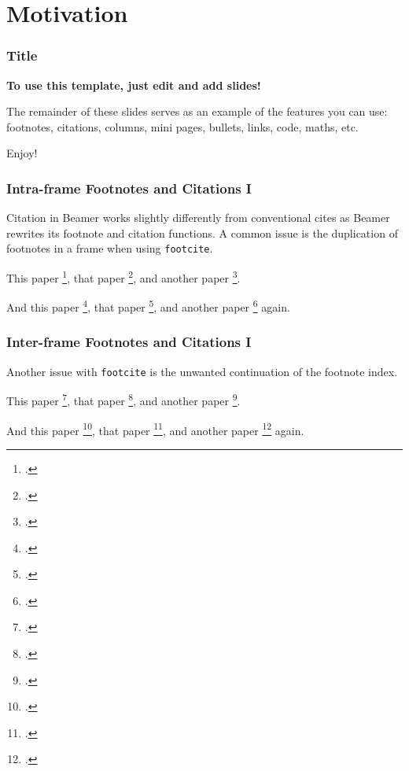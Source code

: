 \section{Motivation} %

\begin{frame}
    \frametitle{Title}
    \begin{center}
        \textbf{To use this template, just edit and add slides!} \newline
    \end{center}

    The remainder of these slides serves as an example of the features you can use: footnotes, citations, columns, mini pages, bullets, links, code, maths, etc.

    \begin{center}
        {\Huge\calligra Enjoy!}
    \end{center}
\end{frame}

\begin{frame}
    \frametitle{Intra-frame Footnotes and Citations I}
    
    Citation in Beamer works slightly differently from conventional cites as Beamer rewrites its footnote and citation functions. 
    A common issue is the duplication of footnotes in a frame when using \texttt{footcite}. \newline

    This paper \footcite{payne2014art}, that paper \footcite{payne2014art}, and another paper \footcite{payne2014art}. \newline

    And this paper \footcite{payne2014art}, that paper \footcite{payne2014art}, and another paper \footcite{payne2014art} again. 
\end{frame}

\begin{frame}
    \frametitle{Inter-frame Footnotes and Citations I}

    Another issue with \texttt{footcite} is the unwanted continuation of the footnote index. \newline

    This paper \footcite{payne2014art}, that paper \footcite{payne2014art}, and another paper \footcite{payne2014art}. \newline

    And this paper \footcite{payne2014art}, that paper \footcite{payne2014art}, and another paper \footcite{payne2014art} again. \newline

\end{frame}

